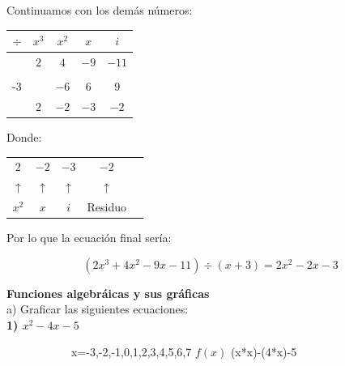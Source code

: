 \documentclass[11pt]{report}
\begin{document}
\indent Continuamos con los demás números:
\begin{center}
	\begin{tabular}{c|cccc|}
		$\div$ & $x^{3}$ & $x^{2}$ & $x$ & $i$\\ \hline
		& $2$ & $4$ & $-9$ & $-11$\\
		& & & &\\
		-3&  & $-6$ & $6$ & $9$ \\ \hline
		& $2$ & $-2$ & $-3$ & $-2$ \\
	\end{tabular}
	Donde:
	\begin{tabular}{ccccc}
		$2$ & $-2$ & $-3$ & $-2$ \\ 
		$\uparrow$ & $\uparrow$ & $\uparrow$ & $\uparrow$\\ 
		$x^{2}$ & $x$ & $i$ & Residuo\\
	\end{tabular}
	
\end{center}

\indent Por lo que la ecuación final sería:

$$(2x^{3}+4x^{2}-9x-11) \div (x+3)=2x^{2}-2x-3$$

\pagebreak
\pagebreak \textbf {Funciones algebráicas y sus gráficas}\\[2mm]
a) Graficar las siguientes ecuaciones:\\[2mm]
\indent \textbf { 1) $x^2-4x-5$ }\\[2mm]
\begin{figure}[h]
	\begin{subfigure}{0.3\textwidth}
		\begin{center}
			{x=-3,-2,-1,0,1,2,3,4,5,6,7} 
			{$f(x)$}
			{(x*x)-(4*x)-5}
		\end{center}
	\end{subfigure}
\begin{subfigure}{0.5\textwidth}
\end{subfigure}
\end{figure}
\end{document}

